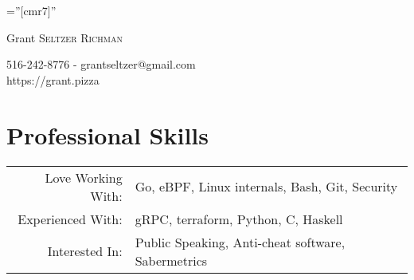 \documentclass[a4paper,10pt]{article}
\begin{document}
\pagestyle{empty} %

\font\fb=''[cmr7]'' %

\par{\centering
		{\Huge Grant \textsc{Seltzer Richman}
	}\par}

\par{\centering
    {516-242-8776 - grantseltzer@gmail.com}\\
    {https://grant.pizza}
\par}

\section{Professional Skills}
\begin{tabular}{rl}
Love Working With:& Go, eBPF, Linux internals, Bash, Git, Security\\
Experienced With:& gRPC, terraform, Python, C, Haskell \\ 
Interested In:& Public Speaking, Anti-cheat software, Sabermetrics
\end{tabular}

\end{document}
